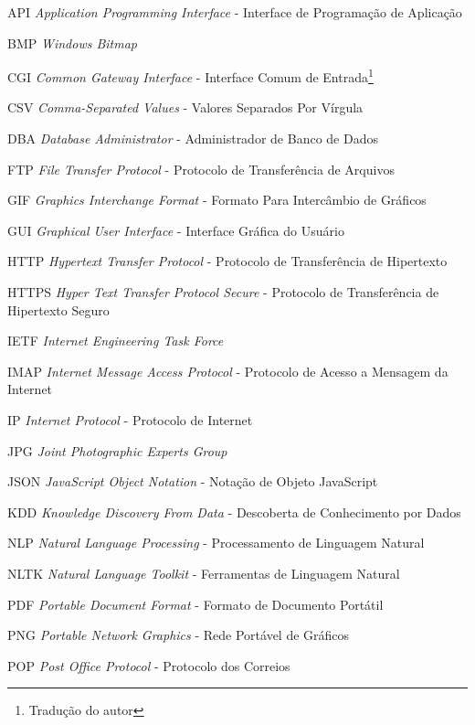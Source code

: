 \begin{siglas}
	\item[API] \textit{Application Programming Interface} - Interface de Programação de Aplicação
	\item[BMP] \textit{Windows Bitmap}
	\item[CGI] \textit{Common Gateway Interface} - Interface Comum de Entrada\footnote{Tradução do autor}
	\item[CSV] \textit{Comma-Separated Values} - Valores Separados Por Vírgula\footnotemark[1]
	\item[DBA] \textit{Database Administrator} - Administrador de Banco de Dados
	\item[FTP] \textit{File Transfer Protocol} - Protocolo de Transferência de Arquivos
	\item[GIF] \textit{Graphics Interchange Format} - Formato Para Intercâmbio de Gráficos\footnotemark[1]
	\item[GUI] \textit{Graphical User Interface} - Interface Gráfica do Usuário
	\item[HTTP] \textit{Hypertext Transfer Protocol} - Protocolo de Transferência de Hipertexto
	\item[HTTPS] \textit{Hyper Text Transfer Protocol Secure} - Protocolo de Transferência de Hipertexto Seguro
	\item[IETF] \textit{Internet Engineering Task Force}
	\item[IMAP] \textit{Internet Message Access Protocol} - Protocolo de Acesso a Mensagem da Internet
	\item[IP] \textit{Internet Protocol} - Protocolo de Internet
	\item[JPG] \textit{Joint Photographic Experts Group}
	\item[JSON] \textit{JavaScript Object Notation} - Notação de Objeto JavaScript\footnotemark[1] 
	\item[KDD] \textit{Knowledge Discovery From Data} - Descoberta de Conhecimento por Dados
	\item[NLP] \textit{Natural Language Processing} - Processamento de Linguagem Natural
	\item[NLTK] \textit{Natural Language Toolkit} - Ferramentas de Linguagem Natural\footnotemark[1]
	\item[PDF] \textit{Portable Document Format} - Formato de Documento Portátil\footnotemark[1]
	\item[PNG] \textit{Portable Network Graphics} - Rede Portável de Gráficos\footnotemark[1]
	\item[POP] \textit{Post Office Protocol} - Protocolo dos Correios

\end{siglas}
